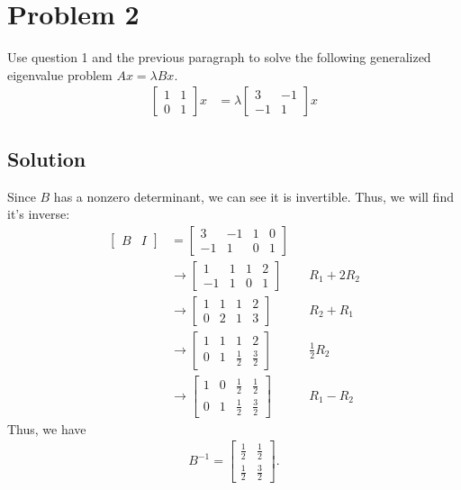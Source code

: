 \documentclass[10pt,a4paper]{article}
\theoremstyle{definition}
\begin{document}
\section*{Problem 2}
Use question 1 and the previous paragraph to solve the following generalized eigenvalue problem $Ax = \lambda B x$.
\begin{align*}
\begin{bmatrix}
1 & 1\\
0 & 1
\end{bmatrix} x &= \lambda \begin{bmatrix}
3 & -1\\
-1 & 1
\end{bmatrix} x
\end{align*}

\subsection*{Solution}
Since $B$ has a nonzero determinant, we can see it is invertible. Thus, we will find it's inverse:
\begin{align*}
\begin{bmatrix}
B & I
\end{bmatrix} &= \begin{bmatrix}
3 & -1 & 1 & 0\\
-1 & 1 & 0 & 1
\end{bmatrix}\\
&\to \begin{bmatrix}
1 & 1 & 1 & 2\\
-1 & 1 & 0 & 1
\end{bmatrix} && R_1 + 2R_2\\
&\to \begin{bmatrix}
1 & 1 & 1 & 2\\
0 & 2 & 1 & 3
\end{bmatrix} && R_2 + R_1\\
&\to \begin{bmatrix}
1 & 1 & 1 & 2\\
0 & 1 & \frac{1}{2} & \frac{3}{2}
\end{bmatrix} && \frac{1}{2}R_2\\
&\to \begin{bmatrix}
1 & 0 & \frac{1}{2} & \frac{1}{2}\\
0 & 1 & \frac{1}{2} & \frac{3}{2}
\end{bmatrix} && R_1 - R_2
\end{align*}
Thus, we have 
\begin{align*}
B^{-1} = \begin{bmatrix}
\frac{1}{2} & \frac{1}{2}\\
\frac{1}{2} & \frac{3}{2}
\end{bmatrix}.
\end{align*}
\end{document}
